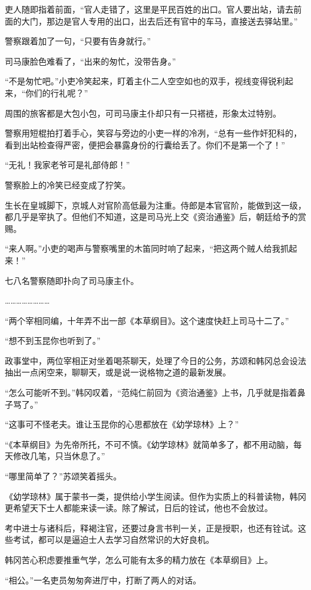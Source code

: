 吏人随即指着前面，“官人走错了，这里是平民百姓的出口。官人要出站，请去前面的大门，那边是官人专用的出口，出去后还有官中的车马，直接送去驿站里。”

警察跟着加了一句，“只要有告身就行。”

司马康脸色难看了，“出来的匆忙，没带告身。”

“不是匆忙吧。”小吏冷笑起来，盯着主仆二人空空如也的双手，视线变得锐利起来，“你们的行礼呢？”

周围的旅客都是大包小包，可司马康主仆却只有一只褡裢，形象太过特别。

警察用短棍拍打着手心，笑容与旁边的小吏一样的冷冽，“总有一些作奸犯科的，看到出站检查得严密，便把会暴露身份的行囊给丢了。你们不是第一个了！”

“无礼！我家老爷可是礼部侍郎！”

警察脸上的冷笑已经变成了狞笑。

生长在皇城脚下，京城人对官阶高低最为注重。侍郎是本官官阶，能做到这一级，都几乎是宰执了。但他们不知道，这是司马光上交《资治通鉴》后，朝廷给予的赏赐。

“来人啊。”小吏的喝声与警察嘴里的木笛同时响了起来，“把这两个贼人给我抓起来！”

七八名警察随即扑向了司马康主仆。

……………………

“两个宰相同编，十年弄不出一部《本草纲目》。这个速度快赶上司马十二了。”

“想不到玉昆你也听到了。”

政事堂中，两位宰相正对坐着喝茶聊天，处理了今日的公务，苏颂和韩冈总会设法抽出一点闲空来，聊聊天，或是说一说格物之道的最新发展。

“怎么可能听不到。”韩冈叹着，“范纯仁前回为《资治通鉴》上书，几乎就是指着鼻子骂了。”

“这事可不怪老夫。谁让玉昆你的心思都放在《幼学琼林》上？”

“《本草纲目》为先帝所托，不可不慎。《幼学琼林》就简单多了，都不用动脑，每天修改几笔，只当休息了。”

“哪里简单了？”苏颂笑着摇头。

《幼学琼林》属于蒙书一类，提供给小学生阅读。但作为实质上的科普读物，韩冈更希望天下士人都能来读一读。除了解试，日后的铨试，他也不会放过。

考中进士与诸科后，释褐注官，还要过身言书判一关，正是授职，也还有铨试。这些考试，都可以是逼迫士人去学习自然常识的大好良机。

韩冈苦心积虑要推重气学，怎么可能有太多的精力放在《本草纲目》上。

“相公。”一名吏员匆匆奔进厅中，打断了两人的对话。

